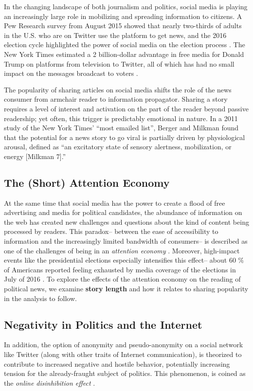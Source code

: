 \documentclass[letterpaper]{article}
\begin{document}
In the changing landscape of both journalism and politics, social media is playing an increasingly large role in mobilizing and spreading information to citizens. A Pew Research survey from August 2015 showed that nearly two-thirds of adults in the U.S. who are on Twitter use the platform to get news, and the 2016 election cycle highlighted the power of social media on the election process \cite{pew-Twitter-news}. The New York Times estimated a 2 billion-dollar advantage in free media for Donald Trump on platforms from television to Twitter, all of which has had no small impact on the messages broadcast to voters \cite{nyt-trump-free-media}.  

The popularity of sharing articles on social media shifts the role of the news consumer from armchair reader to information propagator. Sharing a story requires a level of interest and activation on the part of the reader beyond passive readership; yet often, this trigger is predictably emotional in nature. In a 2011 study of the New York Times' ``most emailed list'', Berger and Milkman found that the potential for a news story to go viral is partially driven by physiological arousal, defined as ``an excitatory state of sensory alertness, mobilization, or energy [Milkman 7].''

\subsection{The (Short) Attention Economy}
At the same time that social media has the power to create a flood of free advertising and media for political candidates, the abundance of information on the web has created new challenges and questions about the kind of content being processed by readers. This paradox-- between the ease of accessibility to information and the increasingly limited bandwidth of consumers-- is described as one of the challenges of being in an \emph{attention economy} \cite{goldhaber1997attention}. Moreover, high-impact events like the presidential elections especially intensifies this effect-- about 60 \% of Americans reported feeling exhausted by media coverage of the elections in July of 2016 \cite{election-fatigue}. To explore the effects of the attention economy on the reading of political news, we examine \textbf{story length} and how it relates to sharing popularity in the analysis to follow.


\subsection{Negativity in Politics and the Internet}
In addition, the option of anonymity and pseudo-anonymity on a social network like Twitter (along with other traits of Internet communication), is theorized to contribute to increased negative and hostile behavior, potentially increasing tension for the already-fraught subject of politics. This phenomenon, is coined as the \emph{online disinhibition effect} \cite{suler2004online}. 
\end{document}
